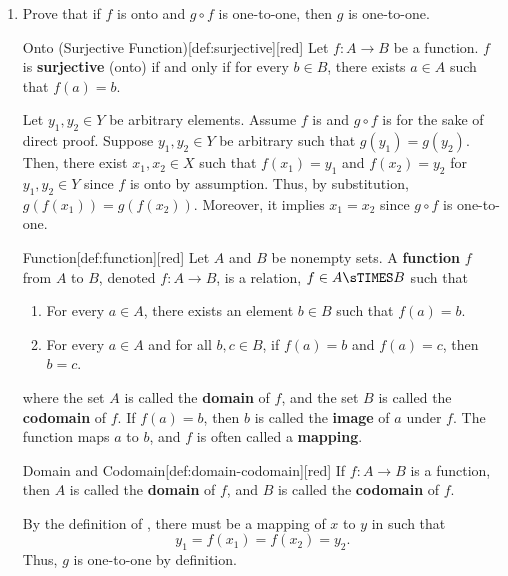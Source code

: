 \begin{enumerate}
\begin{enumerate}
\begin{subprove}
    \end{subprove}
    \newpage
    \item Prove that if $f$ is onto and $g \circ f$ is one-to-one, then $g$ is one-to-one.
    \begin{define}{Onto (Surjective Function)}[def:surjective][red]
      Let $f : A \to B$ be a function. $f$ is \textbf{surjective} (onto) if and only if for every $b \in B$, there exists $a \in A$ such that $f(a) = b$.
    \end{define}
    \begin{subprove}
      Let $y_1, y_2 \in Y$ be arbitrary elements. 
      Assume $f$ is  and $g \circ f$ is  
      for the sake of direct proof.\proofstep
      Suppose $y_1, y_2 \in Y$ be arbitrary such that $g(y_1) = g(y_2)$.
      Then, there exist $x_1, x_2 \in X$ such that 
      $f(x_1) = y_1$ and $f(x_2) = y_2$ for $y_1, y_2 \in Y$ since $f$ is onto by assumption. 
      Thus, by substitution, $g(f(x_1)) = g(f(x_2))$.
      Moreover, it implies $x_1 = x_2$ since $g \circ f$ is one-to-one. 
      \begin{define}{Function}[def:function][red]
        Let $A$ and $B$ be nonempty sets. A \textbf{function} $f$ from $A$ to $B$, denoted $f : A \to B$, 
        is a relation, $f\in A\sTIMES B$ such that 
        \begin{enumerate}
          \item For every $a \in A$, there exists an element $b \in B$ such that $f(a) = b$.
          \item For every $a \in A$ and for all $b, c \in B$, if $f(a) = b$ and $f(a) = c$, then $b = c$.
        \end{enumerate}
        where the set $A$ is called the \textbf{domain} of $f$, 
        and the set $B$ is called the \textbf{codomain} of $f$.
        If $f(a)=b$, then $b$ is called the \textbf{image} of $a$ under $f$.
        The function maps $a$ to $b$, and $f$ is often called a \textbf{mapping}.
      \end{define}
      \begin{define}{Domain and Codomain}[def:domain-codomain][red]
        If $f : A \to B$ is a function, then $A$ is called the \textbf{domain} of $f$, and $B$ is called the \textbf{codomain} of $f$.
      \end{define}
      By the definition of , there must be a mapping of $x$ to $y$ in  such that
      $$y_1 = f(x_1) = f(x_2) = y_2.$$
      Thus, $g$ is one-to-one by definition.\proofstep

\end{subprove}
\end{enumerate}
\end{enumerate}
